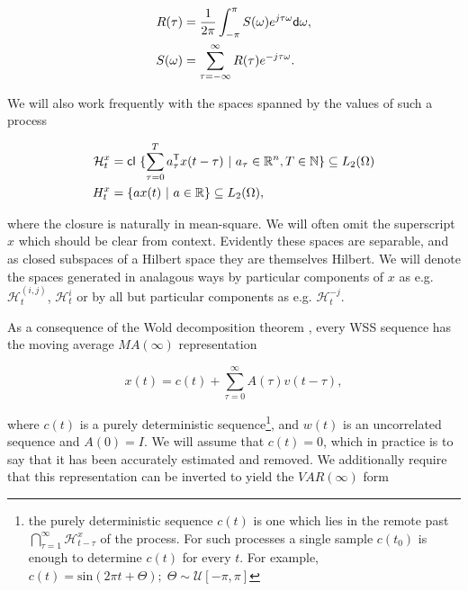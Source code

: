 \documentclass[12pt]{article}
\def\H{\mathcal{H}}  %
\begin{document}
\begin{equation}
  \label{eqn:fourier_pair}
  \begin{aligned}
    R(\tau) &= \frac{1}{2\pi}\int_{-\pi}^\pi S(\omega) e^{j\tau\omega}\mathsf{d} \omega,\\
    S(\omega) &= \sum_{\tau=-\infty}^\infty R(\tau)e^{-j\tau\omega}.
  \end{aligned}
\end{equation}



We will also work frequently with the spaces spanned by the values of
such a process

\begin{equation}
  \label{eq:hilbert_space_defn}
  \begin{aligned}
    \H_t^x &= \cl \{\sum_{\tau = 0}^T a_\tau^\T x(t - \tau)\ |\ a_\tau \in \R^n, T \in \N\} \subseteq L_2(\Omega)\\
    H_t^x &= \{a x(t)\ |\ a \in \R\} \subseteq L_2(\Omega),
  \end{aligned}
\end{equation}

where the closure is naturally in mean-square.  We will often omit the
superscript $x$ which should be clear from context.  Evidently these
spaces are separable, and as closed subspaces of a Hilbert space they
are themselves Hilbert.  We will denote the spaces generated in
analagous ways by particular components of $x$ as e.g.
$\H_t^{(i, j)}$, $\H_t^{i}$ or by all but particular components as
e.g. $\H_t^{-j}$.

As a consequence of the Wold decomposition theorem \cite{lindquist},
every WSS sequence has the moving average $MA(\infty)$
representation

\begin{equation}
\label{eqn:wold}
  x(t) = c(t) + \sum_{\tau = 0}^\infty A(\tau) v(t - \tau),
\end{equation}

where $c(t)$ is a purely deterministic sequence\footnote{the purely
  deterministic sequence $c(t)$ is one which lies in the remote past
  $\bigcap_{\tau=1}^\infty \H_{t - \tau}^x$ of the process.  For such
  processes a single sample $c(t_0)$ is enough to determine $c(t)$ for
  every $t$.  For example,
  $c(t) = \text{sin}(2\pi t + \Theta);\; \Theta \sim \mathcal{U}[-\pi,
  \pi]$}, and $w(t)$ is an uncorrelated sequence and $A(0) = I$.  We
will assume that $c(t) = 0$, which in practice is to say that it has
been accurately estimated and removed.  We additionally require that
this representation can be inverted to yield the $VAR(\infty)$ form
\end{document}
